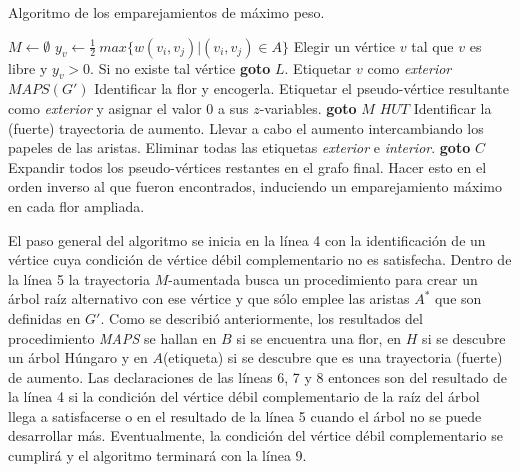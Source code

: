 \documentclass[10pt,a5paper]{book}
\begin{document}
\begin{algorithm}[H]
\caption{Algoritmo de los emparejamientos de máximo peso.}
\BlankLine
\dontprintsemicolon
$M \leftarrow \emptyset$\;
{
  $y_v \leftarrow \frac{1}{2}\ max\{w(v_i,v_j)|(v_i,v_j) \in A\}$\;
}
%
Elegir un vértice $v$ tal que $v$ es libre y $y_v > 0$. Si no existe tal vértice \textbf{goto} $L$. Etiquetar $v$ como \emph{exterior}\;
%
$MAPS(G')$\;
%
Identificar la flor y encogerla. Etiquetar el pseudo-vértice resultante como \emph{exterior} y asignar el valor 0 a sus $z$-variables. \textbf{goto} $M$\;
%
$HUT$\;
%
Identificar la (fuerte) trayectoria de aumento. Llevar a cabo el aumento intercambiando los papeles de las aristas. Eliminar todas las etiquetas \emph{exterior} e \emph{interior}. \textbf{goto} $C$\;
%
Expandir todos los pseudo-vértices restantes en el grafo final. Hacer esto en el orden inverso al que fueron encontrados, induciendo un emparejamiento máximo en cada flor ampliada.\;
\end{algorithm}

El paso general del algoritmo se inicia en la línea 4 con la identificación de un vértice cuya condición de vértice débil complementario no es satisfecha. Dentro de la línea 5 la trayectoria $M$-aumentada busca un procedimiento para crear un árbol raíz alternativo con ese vértice y que sólo emplee las aristas $A^*$ que son definidas en $G'$. Como se describió anteriormente, los resultados del procedimiento \emph{MAPS} se hallan en $B$ si se encuentra una flor, en $H$ si se descubre un árbol Húngaro y en $A$(etiqueta) si se descubre que es una trayectoria (fuerte) de aumento. Las declaraciones de las líneas 6, 7 y 8 entonces son del resultado de la línea 4 si la condición del vértice débil complementario de la raíz del árbol llega a satisfacerse o en el resultado de la línea 5 cuando el árbol no se puede desarrollar más. Eventualmente, la condición del vértice débil complementario se cumplirá y el algoritmo terminará con la línea 9.
\end{document}
